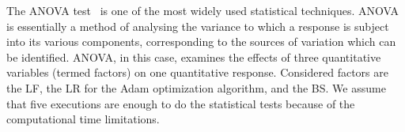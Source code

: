 \documentclass[journal]{IEEEtran}
\begin{document}
	The ANOVA test~\cite{miller1997beyond} is one of the most widely used statistical techniques. ANOVA is essentially a method of analysing the variance to which a response is subject into its various components, corresponding to the sources of variation which can be identified. ANOVA, in this case, examines the effects of three quantitative variables (termed factors) on one quantitative response. Considered factors are the LF, the LR for the Adam optimization algorithm, and the BS. We assume that five executions are enough to do the statistical tests because of the computational time limitations.
	
	
	
\end{document}
